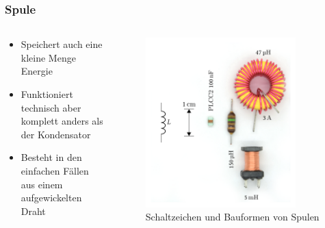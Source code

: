 \begin{frame}
\end{frame}

\begin{frame}
\frametitle{Spule}
\begin{columns}
    \begin{column}{0.48\textwidth}
    \begin{itemize}
  \item Speichert auch eine kleine Menge Energie
  \item Funktioniert technisch aber komplett anders als der Kondensator
  \item Besteht in den einfachen Fällen aus einem aufgewickelten Draht
  \end{itemize}

    \end{column}
   \begin{column}{0.48\textwidth}
       
\begin{figure}
    \includegraphics[width=0.85\textwidth]{foto/207}
    \caption{\scriptsize Schaltzeichen und Bauformen von Spulen}
    \label{n_bauelemente_spule}
\end{figure}

   \end{column}
\end{columns}

\end{frame}

